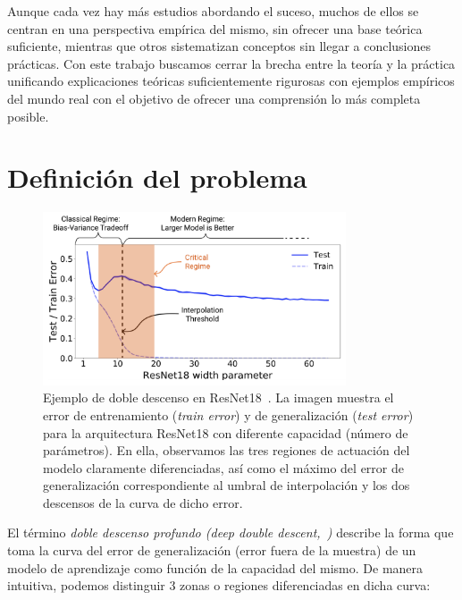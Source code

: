 Aunque cada vez hay más estudios abordando el suceso, muchos de ellos se centran en una perspectiva empírica del mismo, sin ofrecer una base teórica suficiente, mientras que otros sistematizan conceptos sin llegar a conclusiones prácticas. Con este trabajo buscamos cerrar la brecha entre la teoría y la práctica unificando explicaciones teóricas suficientemente rigurosas con ejemplos empíricos del mundo real con el objetivo de ofrecer una comprensión lo más completa posible.\newline


\section{Definición del problema}

\begin{figure}[h]
    \centering
    \includegraphics[width=0.8\textwidth]{img/problem-definition.png}
    \caption[Ejemplo de doble descenso profundo en ResNet18~\cite{Nakkiran2019}.] {Ejemplo de doble descenso en ResNet18~\cite{Nakkiran2019}. La imagen muestra el error de entrenamiento (\textit{train error}) y de generalización (\textit{test error}) para la arquitectura ResNet18 con diferente capacidad (número de parámetros). En ella, observamos las tres regiones de actuación del modelo claramente diferenciadas, así como el máximo del error de generalización correspondiente al umbral de interpolación y los dos descensos de la curva de dicho error.}\label{fig:ejemplo-definicion-double-descent}
\end{figure}

El término \emph{doble descenso profundo (deep double descent,~\cite{Belkin2019})} describe la forma que toma la curva del error de generalización (error fuera de la muestra) de un modelo de aprendizaje como función de la capacidad del mismo. De manera intuitiva, podemos distinguir 3 zonas o regiones diferenciadas en dicha curva:

